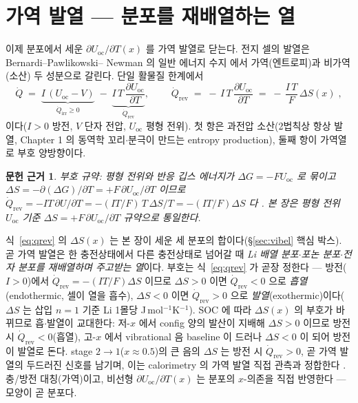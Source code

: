 \documentclass[11pt,a4paper]{article}
\newtheorem*{srcbox}{문헌 근거}
\newcommand{\rev}{\mathrm{rev}}
\newcommand{\irr}{\mathrm{irr}}
\newcommand{\oc}{\mathrm{oc}}
\begin{document}
\section{가역 발열 — 분포를 재배열하는 열}\label{sec:revheat}
이제 분포에서 세운 $\partial U_\oc/\partial T(x)$ 를 가역 발열로 닫는다. 전지 셀의 발열은 Bernardi--Pawlikowski--
Newman 의 일반 에너지 수지 \cite{bernardi1985} 에서 가역(엔트로피)과 비가역(소산) 두 성분으로 갈린다. 단일
활물질 한계에서
\begin{equation}
\dot Q \;=\; \underbrace{I\,(U_\oc-V)}_{\dot Q_\irr\ge0}\;-\;\underbrace{I\,T\,\frac{\partial U_\oc}{\partial T}}_{\dot Q_\rev},
\qquad
\boxed{\;\dot Q_\rev \;=\; -\,I\,T\,\frac{\partial U_\oc}{\partial T}\;=\;-\,\frac{I\,T}{F}\,\Delta S(x)\;,}
\label{eq:qrev}
\end{equation}
이다($I>0$ 방전, $V$ 단자 전압, $U_\oc$ 평형 전위). 첫 항은 과전압 소산(2법칙상 항상 발열, Chapter 1 의
동역학 꼬리$\cdot$분극이 만드는 entropy production), 둘째 항이 가역열로 부호 양방향이다.
\begin{srcbox}
부호 규약: 평형 전위와 반응 깁스 에너지가 $\Delta G=-FU_\oc$ 로 묶이고 $\Delta S=-\partial(\Delta G)/\partial T
=+F\,\partial U_\oc/\partial T$ 이므로 $\dot Q_\rev=-IT\,\partial U/\partial T=-(IT/F)\,T\,\Delta S/T=-(IT/F)\Delta S$
다 \cite{newman,msmr_partI}. 본 장은 평형 전위 $U_\oc$ 기준 $\Delta S=+F\,\partial U_\oc/\partial T$ 규약으로 통일한다.
\end{srcbox}

식~\eqref{eq:qrev} 의 $\Delta S(x)$ 는 본 장이 세운 세 분포의 합이다(\S\ref{sec:vibel} 핵심 박스). 곧 가역
발열은 한 충전상태에서 다른 충전상태로 넘어갈 때 \emph{Li 배열 분포$\cdot$포논 분포$\cdot$전자 분포를 재배열하며
주고받는 열}이다. 부호는 식~\eqref{eq:qrev} 가 곧장 정한다 — 방전($I>0$)에서 $\dot Q_\rev=-(IT/F)\Delta S$
이므로 $\Delta S>0$ 이면 $\dot Q_\rev<0$ 으로 \emph{흡열}(endothermic, 셀이 열을 흡수), $\Delta S<0$ 이면
$\dot Q_\rev>0$ 으로 \emph{발열}(exothermic)이다($\Delta S$ 는 삽입 $n=1$ 기준 Li 1몰당
J\,mol$^{-1}$K$^{-1}$). SOC 에 따라 $\Delta S(x)$ 의 부호가 바뀌므로 흡$\cdot$발열이 교대한다: 저-$x$ 에서
config 양의 발산이 지배해 $\Delta S>0$ 이므로 방전 시 $\dot Q_\rev<0$(흡열), 고-$x$ 에서 vibrational 음
baseline 이 드러나 $\Delta S<0$ 이 되어 방전이 발열로 돈다. stage $2\to1$($x\approx0.5$)의 큰 음의 $\Delta S$
는 방전 시 $\dot Q_\rev>0$, 곧 가역 발열의 두드러진 신호를 남기며, 이는 calorimetry 의 가역 발열 직접 관측과
정합한다 \cite{standardised2024}. 충/방전 대칭(가역)이고, 비선형 $\partial U_\oc/\partial T(x)$ 는 분포의
$x$-의존을 직접 반영한다 — 모양이 곧 분포다.
\end{document}
